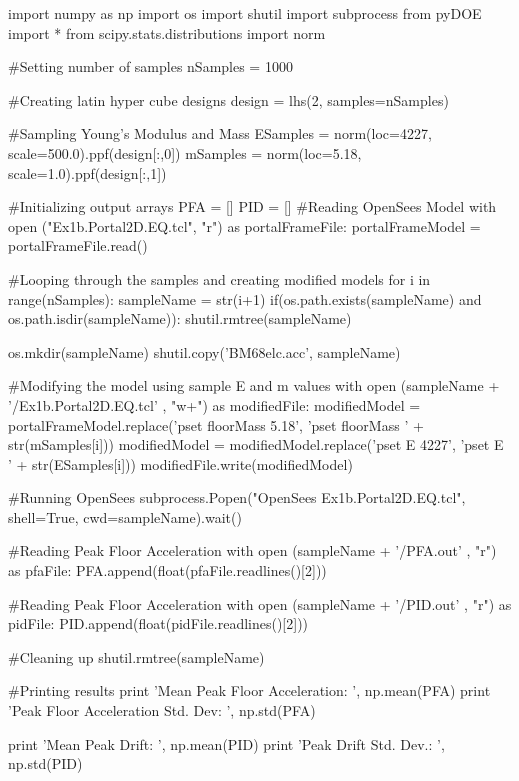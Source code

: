 \begin{python}[caption=Python script for analyzing the portal frame model with uncertain parameters]
import numpy as np
import os
import shutil
import subprocess
from pyDOE import *
from scipy.stats.distributions import norm

#Setting number of samples
nSamples = 1000

#Creating latin hyper cube designs
design = lhs(2, samples=nSamples)

#Sampling Young's Modulus and Mass
ESamples = norm(loc=4227, scale=500.0).ppf(design[:,0])
mSamples = norm(loc=5.18, scale=1.0).ppf(design[:,1])

#Initializing output arrays
PFA = []
PID = []
#Reading OpenSees Model
with open ("Ex1b.Portal2D.EQ.tcl", "r") as portalFrameFile:
    portalFrameModel = portalFrameFile.read()

    #Looping through the samples and creating modified models
    for i in range(nSamples):
        sampleName = str(i+1)
        if(os.path.exists(sampleName) and os.path.isdir(sampleName)):
            shutil.rmtree(sampleName)

        os.mkdir(sampleName)
        shutil.copy('BM68elc.acc', sampleName)

        #Modifying the model using sample E and m values
        with open (sampleName + '/Ex1b.Portal2D.EQ.tcl' , "w+") as modifiedFile:
            modifiedModel = portalFrameModel.replace('pset floorMass 5.18', 'pset floorMass ' + str(mSamples[i]))
            modifiedModel = modifiedModel.replace('pset E 4227', 'pset E ' + str(ESamples[i]))
            modifiedFile.write(modifiedModel)

        #Running OpenSees
        subprocess.Popen("OpenSees Ex1b.Portal2D.EQ.tcl", shell=True, cwd=sampleName).wait()

        #Reading Peak Floor Acceleration
        with open (sampleName + '/PFA.out' , "r") as pfaFile:
            PFA.append(float(pfaFile.readlines()[2]))

        #Reading Peak Floor Acceleration
        with open (sampleName + '/PID.out' , "r") as pidFile:
            PID.append(float(pidFile.readlines()[2]))

        #Cleaning up
        shutil.rmtree(sampleName)

#Printing results
print 'Mean Peak Floor Acceleration: ', np.mean(PFA)
print 'Peak Floor Acceleration Std. Dev: ', np.std(PFA)

print 'Mean Peak Drift: ', np.mean(PID)
print 'Peak Drift Std. Dev.: ', np.std(PID)
\end{python}

